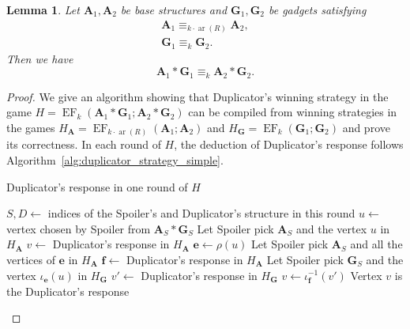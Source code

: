 \documentclass[11pt]{article}
\theoremstyle{plain}
\newtheorem{lemma}[theorem]{Lemma}
\theoremstyle{definition}
\theoremstyle{remark}
\DeclareMathOperator\aritysym{ar}
\newcommand{\arity}[1]{{\aritysym({#1})}}
\DeclareMathOperator{\EF}{EF}
\newcommand{\str}[1]{\mathbf{#1}}
\newcommand{\tpl}[1]{{\bm{#1}}}
\begin{document}
\begin{lemma}\label{lem:continuity_bound_via_ef_games}
    Let $\str{A}_1, \str{A}_2$ be base structures and $\str{G}_1, \str{G}_2$ be gadgets satisfying
    \begin{equation*}
        \begin{gathered} \str{A}_1 \equiv_{k \cdot \arity{R}} \str{A}_2
            , \\
            \str{G}_1 \equiv_{k} \str{G}_2
            .
        \end{gathered}
    \end{equation*}
    Then we have
    \[
        \str{A}_1 * \str{G}_1 \equiv_k \str{A}_2 * \str{G}_2
        .
    \]
\end{lemma}
\begin{proof}
    We give an algorithm showing that Duplicator's winning strategy in the game $H = \EF_k(\str{A}_1*\str{G}_1; \str{A}_2*\str{G}_2)$ can be compiled from winning strategies in the games $H_\str{A} = \EF_{k \cdot \arity{R}}(\str{A}_1; \str{A}_2)$ and $H_\str{G} = \EF_k(\str{G}_1; \str{G}_2)$ and prove its correctness.
    In each round of $H$, the deduction of Duplicator's response follows Algorithm~\ref{alg:duplicator_strategy_simple}.
    
\begin{algorithm}
    \caption{Duplicator's response in one round of $H$}
    \label{alg:duplicator_strategy_simple}
    \begin{algorithmic}[1]
        \State $S, D \gets$ indices of the Spoiler's and Duplicator's structure in this round
        \State $u \gets$ vertex chosen by Spoiler from $\str{A}_S * \str{G}_S$ 
            \State Let Spoiler pick $\str{A}_S$ and the vertex $u$ in $H_\str{A}$
            \State $v \gets$ Duplicator's response in $H_\str{A}$
        \Else
            \State $\tpl{e} \gets \rho(u)$
            \State Let Spoiler pick $\str{A}_S$ and all the vertices of $\tpl{e}$ in $H_\str{A}$
                \label{step:pick_r_edge}
            \State $\tpl{f} \gets$ Duplicator's response in $H_\str{A}$
                \label{step:selecting_corresponding_r_edge}
            \State Let Spoiler pick $\str{G}_S$ and the vertex $\iota_\tpl{e}(u)$ in $H_\str{G}$
            \State $v' \gets$ Duplicator's response in $H_\str{G}$
            \State $v \gets \iota_\tpl{f}^{-1}(v')$
        \EndIf
        \State Vertex $v$ is the Duplicator's response
    \end{algorithmic}
\end{algorithm}


\end{proof}
\end{document}
